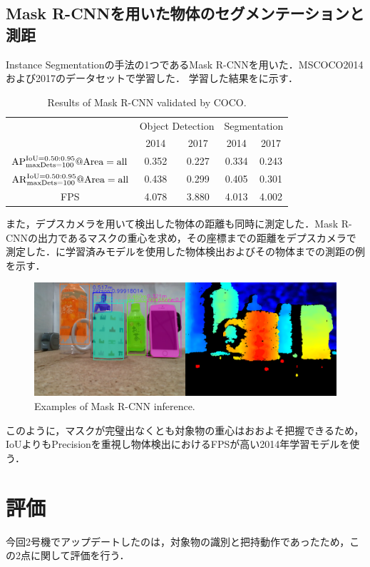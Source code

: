 \subsection{Mask R-CNNを用いた物体のセグメンテーションと測距}
Instance Segmentationの手法の1つであるMask R-CNNを用いた．MSCOCO2014および2017のデータセットで学習した．
学習した結果をに示す．

\begin{table}[H]
    \centering
    \caption{Results of Mask R-CNN validated by COCO.}
    \begin{tabular}{ccccc}\toprule
        & \multicolumn{2}{c}{Object Detection} & \multicolumn{2}{c}{Segmentation} \\ 
         & 2014 & 2017 & 2014 & 2017 \\ \midrule
        $\rm{AP}^{\rm{IoU}=0.50:0.95} _{\rm maxDets=100} @Area=all$ & 0.352 & 0.227 & 0.334 & 0.243 \\ 
        $\rm{AR}^{\rm{IoU}=0.50:0.95} _{\rm maxDets=100} @Area=all$ & 0.438 & 0.299 & 0.405 & 0.301 \\ 
        FPS & 4.078 & 3.880 & 4.013 & 4.002 \\ \bottomrule
    \end{tabular} 
    \label{tab:MSCOCO評価}
\end{table}

また，デプスカメラを用いて検出した物体の距離も同時に測定した．Mask R-CNNの出力であるマスクの重心を求め，その座標までの距離をデプスカメラで測定した．に学習済みモデルを使用した物体検出およびその物体までの測距の例を示す．

\begin{figure}[H]
    \centering
    \includegraphics[width=0.7\linewidth]{figure/chapter4/MaskR-CNN_screenshot}
    \caption{Examples of Mask R-CNN inference.}
    \label{fig:maskrcnn例}
\end{figure}


このように，マスクが完璧出なくとも対象物の重心はおおよそ把握できるため，IoUよりもPrecisionを重視し物体検出におけるFPSが高い2014年学習モデルを使う．


\section{評価}
今回2号機でアップデートしたのは，対象物の識別と把持動作であったため，この2点に関して評価を行う．

